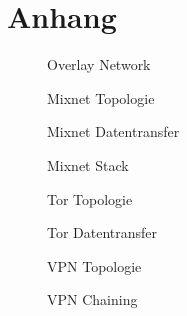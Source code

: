 \section{Anhang}

\begin{figure}[h!]
    \centering
    
    \caption{Overlay Network}
\end{figure}
\begin{figure}[h!]
    \centering
    
    \caption{Mixnet Topologie}
\end{figure}
\begin{figure}[h!]
    \centering
    
    \caption{Mixnet Datentransfer}
\end{figure}
\begin{figure}[h!]
    \centering
    
    \caption{Mixnet Stack}
\end{figure}
\begin{figure}[h!]
    \centering
    
    \caption{Tor Topologie}
\end{figure}
\begin{figure}[h!]
    \centering
    
    \caption{Tor Datentransfer}
\end{figure}
\begin{figure}[h!]
    \centering
    
    \caption{VPN Topologie}
\end{figure}
\begin{figure}[h!]
    \centering
    
    \caption{VPN Chaining}
\end{figure}
